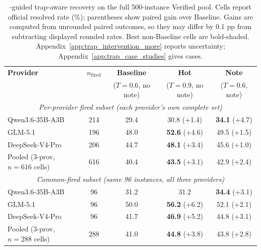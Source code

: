 \begin{table}[!htbp]
\centering
\small
\setlength{\tabcolsep}{5pt}
\renewcommand{\arraystretch}{1.15}
\begin{tabular}{lc|c|cc}
\toprule
\textbf{Provider} & $n_{\text{fired}}$ & \textbf{Baseline} & \textbf{Hot} & \textbf{Note} \\
 & & {\scriptsize($T{=}0.6$, no note)} & {\scriptsize($T{=}0.9$, no note)} & {\scriptsize($T{=}0.6$, note)} \\
\midrule
\multicolumn{5}{c}{\emph{Per-provider fired subset (each provider's own complete set)}} \\
\midrule
Qwen3.6-35B-A3B & 214 & 29.4 & 30.8 {\scriptsize\textcolor{gaincolor}{(+1.4)}} & \cellcolor{bestcolor}\textbf{34.1} {\scriptsize\textcolor{gaincolor}{(+4.7)}} \\
GLM-5.1 & 196 & 48.0 & \cellcolor{bestcolor}\textbf{52.6} {\scriptsize\textcolor{gaincolor}{(+4.6)}} & 49.5 {\scriptsize\textcolor{gaincolor}{(+1.5)}} \\
DeepSeek-V4-Pro & 206 & 44.7 & \cellcolor{bestcolor}\textbf{48.1} {\scriptsize\textcolor{gaincolor}{(+3.4)}} & 45.6 {\scriptsize\textcolor{gaincolor}{(+1.0)}} \\
\midrule
\rowcolor{highlight}
Pooled (3-prov, $n{=}616$ cells) & 616 & 40.4 & \textbf{43.5} {\scriptsize\textcolor{gaincolor}{(+3.1)}} & 42.9 {\scriptsize\textcolor{gaincolor}{(+2.4)}} \\
\midrule
\multicolumn{5}{c}{\emph{Common-fired subset (same 96 instances, all three providers)}} \\
\midrule
Qwen3.6-35B-A3B & 96 & 31.2 & 31.2 \phantom{{\scriptsize{(+0.0)}}} & \cellcolor{bestcolor}\textbf{34.4} {\scriptsize\textcolor{gaincolor}{(+3.1)}} \\
GLM-5.1 & 96 & 50.0 & \cellcolor{bestcolor}\textbf{56.2} {\scriptsize\textcolor{gaincolor}{(+6.2)}} & 52.1 {\scriptsize\textcolor{gaincolor}{(+2.1)}} \\
DeepSeek-V4-Pro & 96 & 41.7 & \cellcolor{bestcolor}\textbf{46.9} {\scriptsize\textcolor{gaincolor}{(+5.2)}} & 44.8 {\scriptsize\textcolor{gaincolor}{(+3.1)}} \\
\midrule
\rowcolor{highlight}
Pooled (3-prov, $n{=}288$ cells) & 288 & 41.0 & \textbf{44.8} {\scriptsize\textcolor{gaincolor}{(+3.8)}} & 43.8 {\scriptsize\textcolor{gaincolor}{(+2.8)}} \\
\bottomrule
\end{tabular}
\caption{\method{}-guided trap-aware recovery on the full 500-instance \swe{} Verified pool. Cells report official resolved rate (\%); parentheses show paired gain over Baseline. Gains are computed from unrounded paired outcomes, so they may differ by 0.1 pp from subtracting displayed rounded rates. Best non-Baseline cells are bold-shaded. Appendix~\ref{app:trap_intervention_more} reports uncertainty; Appendix~\ref{app:trap_case_studies} gives cases.}
\label{tab:swe_4arm_intervention}
\end{table}

